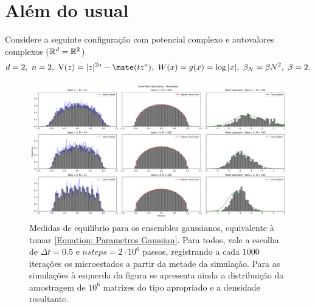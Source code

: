 \section{Além do usual}

Considere a seguinte configuração com potencial complexo e autovalores complexos ($\mathbb{R}^d = \mathbb{R}^2$)
\begin{equation}
	d = 2, \  n = 2, \  \V(z)=|z|^{2a} - \Re{(t z^a)},  \ W(x) = g(x) = \log{|x|},  \ \beta_N = \beta N^2,  \ \beta = 2.
	\label{Equation: Complex}
\end{equation}

\begin{figure}[ht]
	\includegraphics[width=\textwidth]{Assets/validationGaussianTracy.png}
	\caption{Medidas de equilíbrio para os ensembles gaussianos, equivalente à tomar \ref{Equation: Parametros Gaussian}. Para todos, vale a escolha de $\Delta t = 0.5$ e $nsteps = 2\cdot10^6$ passos, registrando a cada $1000$ iterações os microestados a partir da metade da simulação. Para as simulações à esquerda da figura se apresenta ainda a distribuição da amostragem de $10^6$ matrizes do tipo apropriado e a densidade resultante.}
	\label{Figura: Gaussian}
\end{figure}
